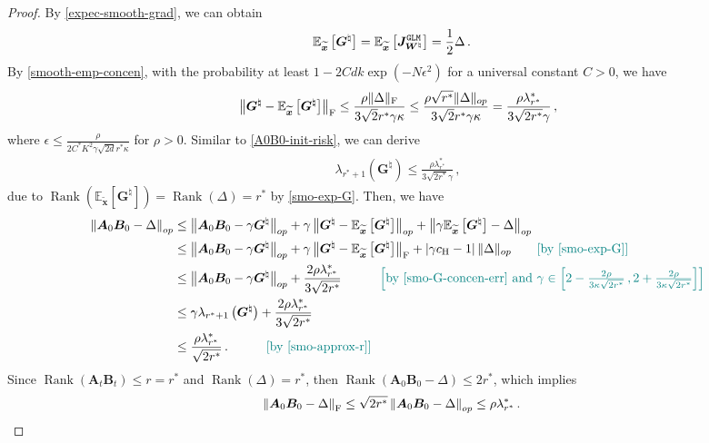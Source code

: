 \begin{proof}
By \cref{expec-smooth-grad}, we can obtain
\begin{align}
    \mathbb{E}_{\widetilde{\bm x}}\left[\bm G^\natural\right] & = \mathbb{E}_{\widetilde{\bm x}}\left[\bm J_{\bm W^\natural}^{\tt GLM}\right] = \frac{1}{2}\Delta\,.\label{smo-exp-G}
\end{align}
By \cref{smooth-emp-concen}, with the probability at least $1-2Cdk\operatorname{exp}(-N\epsilon^2)$ for a universal constant $C>0$, we have
\begin{align}
    \left\|\bm G^\natural - \mathbb{E}_{\widetilde{\bm x}}\left[\bm G^\natural\right]\right\|_{\rm F}\leq \frac{\rho\|\Delta\|_{\rm F}}{3\sqrt{2}r^*\gamma\kappa}\leq \frac{\rho\sqrt{r^*}\|\Delta\|_{op}}{3\sqrt{2}r^*\gamma\kappa}=\frac{\rho\lambda^*_{r^*}}{3\sqrt{2r^*}\gamma}\,,\label{smo-G-concen-err}
\end{align}
where $\epsilon \leq \frac{\rho}{2C^*K^2\gamma\sqrt{2d}r^*\kappa}$ for $\rho>0$. Similar to \cref{A0B0-init-risk}, we can derive
\begin{align}
    \lambda_{r^*+1}\left(\bm G^\natural\right) \leq \frac{\rho\lambda^*_{r^*}}{3\sqrt{2r^*}\gamma}\,,\label{smo-approx-r}
\end{align}
due to $\operatorname{Rank}\left(\mathbb{E}_{\widetilde{\bm x}}\left[\bm G^\natural\right]\right)=\operatorname{Rank}(\Delta)=r^*$ by \cref{smo-exp-G}. Then, we have
\begin{align}
    \left\|\bm A_0 \bm B_0 - \Delta\right\|_{op} & \leq \left\|\bm A_0 \bm B_0 - \gamma\bm G^\natural\right\|_{op} + \gamma\left\|\bm G^\natural - \mathbb{E}_{\widetilde{\bm x}}\left[\bm G^\natural\right]\right\|_{op} + \left\|\gamma\mathbb{E}_{\widetilde{\bm x}}\left[\bm G^\natural\right]-\Delta\right\|_{op}\nonumber\\
    & \leq \left\|\bm A_0 \bm B_0 - \gamma\bm G^\natural\right\|_{op} + \gamma \left\|\bm G^\natural - \mathbb{E}_{\widetilde{\bm x}}\left[\bm G^\natural\right]\right\|_{\rm F} + \left|\gamma c_{\rm H} - 1\right|\|\Delta\|_{op}\tag*{\color{teal}[by \cref{smo-exp-G}]}\nonumber\\
    & \leq \left\|\bm A_0 \bm B_0 - \gamma\bm G^\natural\right\|_{op} + \frac{2\rho\lambda^*_{r^*}}{3\sqrt{2r^*}} \quad\tag*{\color{teal}$\left[\text{by \cref{smo-G-concen-err} and }\gamma\in\left[2-\frac{2\rho}{3\kappa\sqrt{2r^*}}\,,2+\frac{2\rho}{3\kappa\sqrt{2r^*}}\right]\right]$}\nonumber\\
    & \leq \gamma\lambda_{r^*+1}\left(\bm G^\natural\right) + \frac{2\rho\lambda^*_{r^*}}{3\sqrt{2r^*}}\nonumber\\
    & \leq \frac{\rho\lambda^*_{r^*}}{\sqrt{2r^*}}\,.\quad \tag*{\color{teal}[by \cref{smo-approx-r}]}
\end{align}
Since $\operatorname{Rank}\left(\bm A_t \bm B_t\right)\leq r=r^*$ and $\operatorname{Rank}(\Delta)=r^*$, then $\operatorname{Rank}(\bm A_0 \bm B_0 - \Delta)\leq 2r^*$, which implies
\begin{align*}
    \left\|\bm A_0 \bm B_0 - \Delta\right\|_{\rm F} & \leq \sqrt{2r^*} \left\|\bm A_0 \bm B_0 - \Delta\right\|_{op} \leq \rho\lambda^*_{r^*}\,.
\end{align*}
\end{proof}
